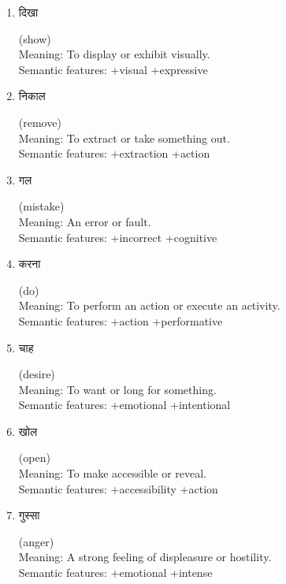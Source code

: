 \documentclass{article}
\begin{document}
\begin{enumerate}
\item \begin{hindi} दिखा \end{hindi} (show) \\
Meaning: To display or exhibit visually. \\
Semantic features: +visual +expressive

\item \begin{hindi} निकाल \end{hindi} (remove) \\
Meaning: To extract or take something out. \\
Semantic features: +extraction +action

\item \begin{hindi} गल \end{hindi} (mistake) \\
Meaning: An error or fault. \\
Semantic features: +incorrect +cognitive

\item \begin{hindi} करना \end{hindi} (do) \\
Meaning: To perform an action or execute an activity. \\
Semantic features: +action +performative

\item \begin{hindi} चाह \end{hindi} (desire) \\
Meaning: To want or long for something. \\
Semantic features: +emotional +intentional

\item \begin{hindi} खोल \end{hindi} (open) \\
Meaning: To make accessible or reveal. \\
Semantic features: +accessibility +action

\item \begin{hindi} गुस्सा \end{hindi} (anger) \\
Meaning: A strong feeling of displeasure or hostility. \\
Semantic features: +emotional +intense


\end{enumerate}
\end{document}
